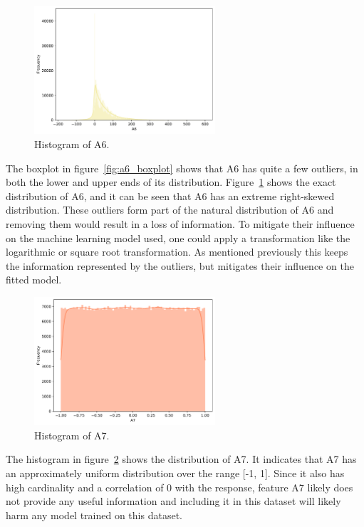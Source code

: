 \documentclass[11pt]{report}
\begin{document}
\begin{figure}[H]
    \centering
    \includegraphics[width=0.6\textwidth]{images/A6_histplot.pdf}
    \caption{Histogram of A6.}
    \label{fig:a6_histplot}
\end{figure}

The boxplot in figure~\ref{fig:a6_boxplot} shows that A6 has quite a few outliers, in both the lower and upper ends of its distribution. Figure~\ref{fig:a6_histplot} shows the exact distribution of A6, and it can be seen that A6 has an extreme right-skewed distribution. These outliers form part of the natural distribution of A6 and removing them would result in a loss of information. To mitigate their influence on the machine learning model used, one could apply a transformation like the logarithmic or square root transformation. As mentioned previously this keeps the information represented by the outliers, but mitigates their influence on the fitted model.

\begin{figure}[H]
    \centering
    \includegraphics[width=0.6\textwidth]{images/A7_histplot.pdf}
    \caption{Histogram of A7.}
    \label{fig:a7_histplot}
\end{figure}

The histogram in figure~\ref{fig:a7_histplot} shows the distribution of A7. It indicates that A7 has an approximately uniform distribution over the range [-1, 1]. Since it also has high cardinality and a correlation of 0 with the response, feature A7 likely does not provide any useful information and including it in this dataset will likely harm any model trained on this dataset.
\end{document}
